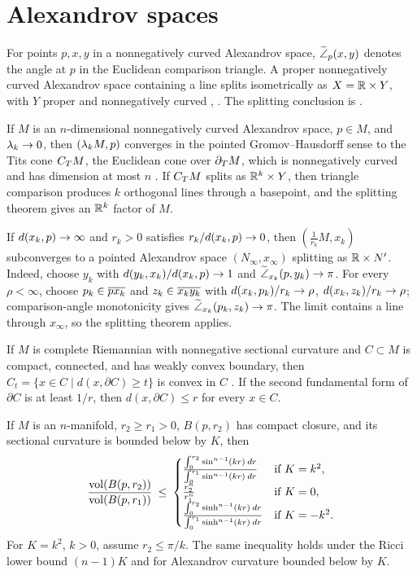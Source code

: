 \section{Alexandrov spaces} \label{Alexandrov}

For points $p,x,y$ in a nonnegatively curved Alexandrov space,
$\widetilde{\angle}_p(x,y)$ denotes the angle at $p$ in the Euclidean comparison
triangle. A proper nonnegatively curved Alexandrov space containing a line
splits isometrically as $X={\mathbb R}\times Y$, with $Y$ proper and nonnegatively
curved \cite[Chapter 10]{Burago-Burago-Ivanov},
\cite{Burago-Gromov-Perelman}. The splitting conclusion is
\cite[Theorem 10.5.1]{Burago-Burago-Ivanov}.

If $M$ is an $n$-dimensional nonnegatively curved Alexandrov space, $p\in M$,
and $\lambda_k\rightarrow0$, then $(\lambda_kM,p)$ converges in the pointed
Gromov--Hausdorff sense to the Tits cone $C_T M$, the Euclidean cone over
$\partial_T M$, which is nonnegatively curved and has dimension at most $n$
\cite[p. 58-59]{Ballmann-Gromov-Schroeder}. If $C_T M$ splits as
${\mathbb R}^k\times Y$, then triangle comparison produces $k$ orthogonal lines
through a basepoint, and the splitting theorem gives an ${\mathbb R}^k$ factor of
$M$.

If $d(x_k,p)\rightarrow\infty$ and $r_k>0$ satisfies
$r_k/d(x_k,p)\rightarrow0$, then $(\frac1{r_k}M,x_k)$ subconverges to a pointed
Alexandrov space $(N_\infty,x_\infty)$ splitting as
${\mathbb R}\times N'$. Indeed, choose $y_k$ with
$d(y_k,x_k)/d(x_k,p)\rightarrow1$ and $\widetilde{\angle}_{x_k}(p,y_k)\rightarrow\pi$. For every
$\rho<\infty$, choose $p_k\in\overline{px_k}$ and $z_k\in\overline{x_ky_k}$ with
$d(x_k,p_k)/r_k\rightarrow\rho$, $d(x_k,z_k)/r_k\rightarrow\rho$; comparison-angle
monotonicity \cite[Chapter 4.3]{Burago-Burago-Ivanov} gives
$\widetilde{\angle}_{x_k}(p_k,z_k)\rightarrow\pi$. The limit contains a line through
$x_\infty$, so the splitting theorem applies.

If $M$ is complete Riemannian with nonnegative sectional curvature and
$C\subset M$ is compact, connected, and has weakly convex boundary, then
$C_t=\{x\in C\mid d(x,\partial C)\geq t\}$ is convex in $C$
\cite[Chapter 8]{Cheeger-Ebin}. If the second fundamental form of
$\partial C$ is at least $1/r$, then $d(x,\partial C)\leq r$ for every
$x\in C$.

If $M$ is an $n$-manifold, $r_2\geq r_1>0$, $B(p,r_2)$ has compact closure,
and its sectional curvature is bounded below by $K$, then
\begin{equation} \label{BG}
\frac{\operatorname{vol}(B(p,r_2))}{\operatorname{vol}(B(p,r_1))}\: \le \:
\begin{cases}
\frac{\int_0^{r_2}\sin^{n-1}(kr)\:dr}{\int_0^{r_1}\sin^{n-1}(kr)\:dr}
& \text{if }K=k^2,\\
\frac{r_2^n}{r_1^n}& \text{if }K=0,\\
\frac{\int_0^{r_2}\sinh^{n-1}(kr)\:dr}{\int_0^{r_1}\sinh^{n-1}(kr)\:dr}
& \text{if }K=-k^2.
\end{cases}
\end{equation}
For $K=k^2$, $k>0$, assume $r_2\leq\pi/k$. The same inequality holds
under the Ricci lower bound $(n-1)K$ and for Alexandrov curvature bounded
below by $K$.

